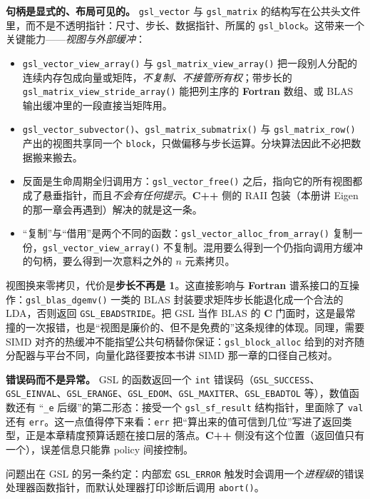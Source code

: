 \documentclass[12pt,a4paper,fontset=fandol]{ctexbook}
\newcommand{\Fn}[1]{\texttt{#1()}}
\newcommand{\Tp}[1]{\texttt{#1}}
\newcommand{\Bk}{\allowbreak}
\newcommand{\Lang}[1]{\textsf{\bfseries #1}}
\newcommand{\CL}{\Lang{C}}
\newcommand{\CPP}{\Lang{C++}}
\newcommand{\FTN}{\Lang{Fortran}}
\begin{document}
\textbf{句柄是显式的、布局可见的。} \Tp{gsl\_vector} 与 \Tp{gsl\_matrix} 的结构写在公共头文件里，而不是不透明指针：尺寸、步长、数据指针、所属的 \Tp{gsl\_block}。这带来一个关键能力——\emph{视图与外部缓冲}：
\begin{itemize}
\item \Fn{gsl\_vector\Bk\_view\Bk\_array} 与 \Fn{gsl\_matrix\Bk\_view\Bk\_array} 把一段别人分配的连续内存包成向量或矩阵，\emph{不复制、不接管所有权}；带步长的 \Fn{gsl\_matrix\Bk\_view\Bk\_stride\Bk\_array} 能把列主序的 \FTN{} 数组、或 BLAS 输出缓冲里的一段直接当矩阵用。
\item \Fn{gsl\_vector\Bk\_subvector}、\Fn{gsl\_matrix\Bk\_submatrix} 与 \Fn{gsl\_matrix\_row} 产出的视图共享同一个 \Tp{block}，只做偏移与步长运算。分块算法因此不必把数据搬来搬去。
\item 反面是生命周期全归调用方：\Fn{gsl\_vector\Bk\_free} 之后，指向它的所有视图都成了悬垂指针，而且\emph{不会有任何提示}。\CPP{} 侧的 RAII 包装（本册讲 Eigen 的那一章会再遇到）解决的就是这一条。
\item ``复制''与``借用''是两个不同的函数：\Fn{gsl\_vector\Bk\_alloc\Bk\_from\Bk\_array} 复制一份，\Fn{gsl\_vector\Bk\_view\Bk\_array} 不复制。混用要么得到一个仍指向调用方缓冲的句柄，要么得到一次意料之外的 $n$ 元素拷贝。
\end{itemize}

视图换来零拷贝，代价是\textbf{步长不再是 1}。这直接影响与 \FTN{} 谱系接口的互操作：\Fn{gsl\_blas\Bk\_dgemv} 一类的 BLAS 封装要求矩阵步长能退化成一个合法的 LDA，否则返回 \Tp{GSL\_EBADSTRIDE}。把 GSL 当作 BLAS 的 \CL{} 门面时，这是最常撞的一次报错，也是``视图是廉价的、但不是免费的''这条规律的体现。同理，需要 SIMD 对齐的热缓冲不能指望公共句柄替你保证：\Tp{gsl\_block\Bk\_alloc} 给到的对齐随分配器与平台不同，向量化路径要按本书讲 SIMD 那一章的口径自己核对。

\textbf{错误码而不是异常。} GSL 的函数返回一个 \Tp{int} 错误码（\Tp{GSL\_SUCCESS}、\Tp{GSL\_EINVAL}、\Tp{GSL\_ERANGE}、\Tp{GSL\_EDOM}、\Tp{GSL\_MAXITER}、\Tp{GSL\_EBADTOL} 等），数值函数还有 ``\Tp{\_e} 后缀''的第二形态：接受一个 \Tp{gsl\_sf\Bk\_result} 结构指针，里面除了 \Tp{val} 还有 \Tp{err}。这一点值得停下来看：\Tp{err} 把``算出来的值可信到几位''写进了返回类型，正是本章精度预算话题在接口层的落点。\CPP{} 侧没有这个位置（返回值只有一个），误差信息只能靠 policy 间接控制。

问题出在 GSL 的另一条约定：内部宏 \Tp{GSL\_ERROR} 触发时会调用一个\emph{进程级}的错误处理器函数指针，而默认处理器打印诊断后调用 \Fn{abort}。
\end{document}

